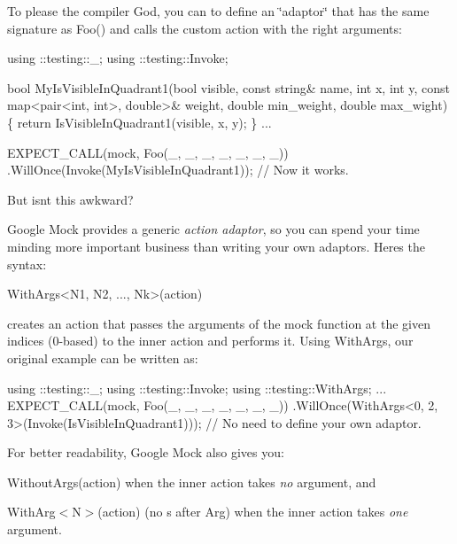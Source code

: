 To please the compiler God, you can to define an \char`\"{}adaptor\char`\"{} that has the same signature as {\ttfamily Foo()} and calls the custom action with the right arguments\+:


\begin{DoxyCode}
using ::testing::\_;
using ::testing::Invoke;

\textcolor{keywordtype}{bool} MyIsVisibleInQuadrant1(\textcolor{keywordtype}{bool} visible, \textcolor{keyword}{const} \textcolor{keywordtype}{string}& name, \textcolor{keywordtype}{int} x, \textcolor{keywordtype}{int} y,
                            \textcolor{keyword}{const} map<pair<int, int>, \textcolor{keywordtype}{double}>& weight,
                            \textcolor{keywordtype}{double} min\_weight, \textcolor{keywordtype}{double} max\_wight) \{
  \textcolor{keywordflow}{return} IsVisibleInQuadrant1(visible, x, y);
\}
...

  EXPECT\_CALL(mock, Foo(\_, \_, \_, \_, \_, \_, \_))
      .WillOnce(Invoke(MyIsVisibleInQuadrant1));  \textcolor{comment}{// Now it works.}
\end{DoxyCode}


But isn\textquotesingle{}t this awkward?

Google Mock provides a generic {\itshape action adaptor}, so you can spend your time minding more important business than writing your own adaptors. Here\textquotesingle{}s the syntax\+:


\begin{DoxyCode}
WithArgs<N1, N2, ..., Nk>(action)
\end{DoxyCode}


creates an action that passes the arguments of the mock function at the given indices (0-\/based) to the inner {\ttfamily action} and performs it. Using {\ttfamily With\+Args}, our original example can be written as\+:


\begin{DoxyCode}
using ::testing::\_;
using ::testing::Invoke;
using ::testing::WithArgs;
...
  EXPECT\_CALL(mock, Foo(\_, \_, \_, \_, \_, \_, \_))
      .WillOnce(WithArgs<0, 2, 3>(Invoke(IsVisibleInQuadrant1)));
      \textcolor{comment}{// No need to define your own adaptor.}
\end{DoxyCode}


For better readability, Google Mock also gives you\+:


\begin{DoxyItemize}
\item {\ttfamily Without\+Args(action)} when the inner {\ttfamily action} takes {\itshape no} argument, and
\item {\ttfamily With\+Arg$<$N$>$(action)} (no {\ttfamily s} after {\ttfamily Arg}) when the inner {\ttfamily action} takes {\itshape one} argument.
\end{DoxyItemize}

